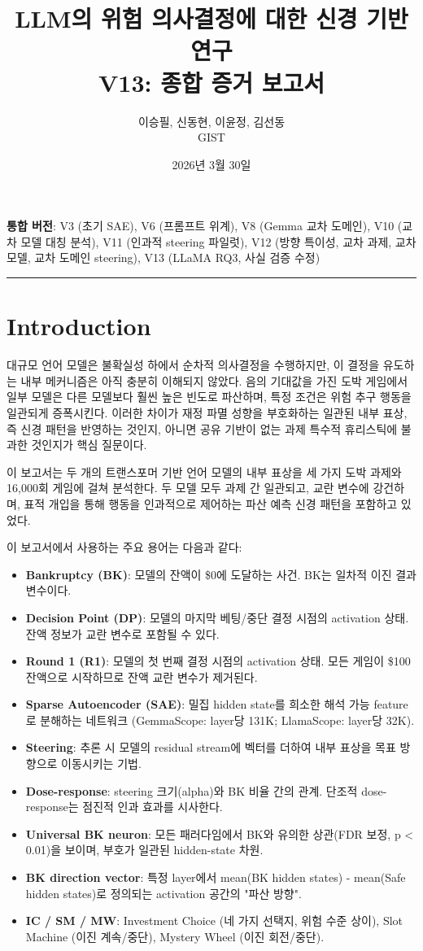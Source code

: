 \documentclass[11pt,a4paper]{article}
\title{LLM의 위험 의사결정에 대한 신경 기반 연구\\[0.5em]\large V13: 종합 증거 보고서}
\author{이승필, 신동현, 이윤정, 김선동\\GIST}
\date{2026년 3월 30일}
\begin{document}
\maketitle\tableofcontents\newpage

\textbf{통합 버전}: V3 (초기 SAE), V6 (프롬프트 위계), V8 (Gemma 교차 도메인), V10 (교차 모델 대칭 분석), V11 (인과적 steering 파일럿), V12 (방향 특이성, 교차 과제, 교차 모델, 교차 도메인 steering), V13 (LLaMA RQ3, 사실 검증 수정)

\bigskip\hrule\bigskip

\section{Introduction}

대규모 언어 모델은 불확실성 하에서 순차적 의사결정을 수행하지만, 이 결정을 유도하는 내부 메커니즘은 아직 충분히 이해되지 않았다. 음의 기대값을 가진 도박 게임에서 일부 모델은 다른 모델보다 훨씬 높은 빈도로 파산하며, 특정 조건은 위험 추구 행동을 일관되게 증폭시킨다. 이러한 차이가 재정 파멸 성향을 부호화하는 일관된 내부 표상, 즉 신경 패턴을 반영하는 것인지, 아니면 공유 기반이 없는 과제 특수적 휴리스틱에 불과한 것인지가 핵심 질문이다.

이 보고서는 두 개의 트랜스포머 기반 언어 모델의 내부 표상을 세 가지 도박 과제와 16,000회 게임에 걸쳐 분석한다. 두 모델 모두 과제 간 일관되고, 교란 변수에 강건하며, 표적 개입을 통해 행동을 인과적으로 제어하는 파산 예측 신경 패턴을 포함하고 있었다.

이 보고서에서 사용하는 주요 용어는 다음과 같다:

\begin{itemize}
\item \textbf{Bankruptcy (BK)}: 모델의 잔액이 \$0에 도달하는 사건. BK는 일차적 이진 결과 변수이다.
\item \textbf{Decision Point (DP)}: 모델의 마지막 베팅/중단 결정 시점의 activation 상태. 잔액 정보가 교란 변수로 포함될 수 있다.
\item \textbf{Round 1 (R1)}: 모델의 첫 번째 결정 시점의 activation 상태. 모든 게임이 \$100 잔액으로 시작하므로 잔액 교란 변수가 제거된다.
\item \textbf{Sparse Autoencoder (SAE)}: 밀집 hidden state를 희소한 해석 가능 feature로 분해하는 네트워크 (GemmaScope: layer당 131K; LlamaScope: layer당 32K).
\item \textbf{Steering}: 추론 시 모델의 residual stream에 벡터를 더하여 내부 표상을 목표 방향으로 이동시키는 기법.
\item \textbf{Dose-response}: steering 크기(alpha)와 BK 비율 간의 관계. 단조적 dose-response는 점진적 인과 효과를 시사한다.
\item \textbf{Universal BK neuron}: 모든 패러다임에서 BK와 유의한 상관(FDR 보정, p < 0.01)을 보이며, 부호가 일관된 hidden-state 차원.
\item \textbf{BK direction vector}: 특정 layer에서 mean(BK hidden states) - mean(Safe hidden states)로 정의되는 activation 공간의 "파산 방향".
\item \textbf{IC / SM / MW}: Investment Choice (네 가지 선택지, 위험 수준 상이), Slot Machine (이진 계속/중단), Mystery Wheel (이진 회전/중단).
\end{itemize}
\end{document}
